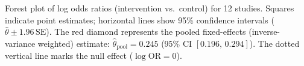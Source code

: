\caption{Forest plot of log odds ratios (intervention vs.\ control) for 12 studies.
Squares indicate point estimates; horizontal lines show 95\% confidence intervals
($\hat\theta \pm 1.96\,\text{SE}$).
The red diamond represents the pooled fixed-effects (inverse-variance weighted)
estimate: $\hat\theta_{\text{pool}} = 0.245$ (95\% CI $[0.196,\, 0.294]$).
The dotted vertical line marks the null effect ($\log\text{OR} = 0$).}
